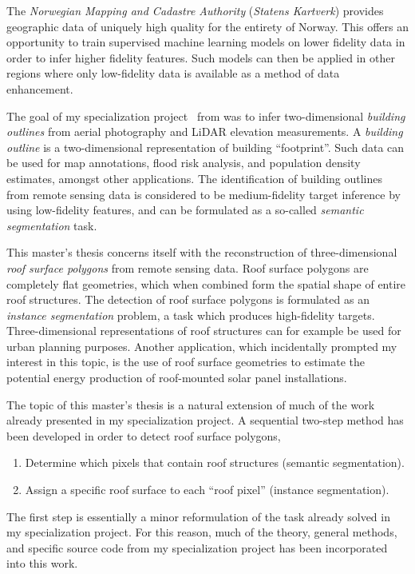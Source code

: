 The \textit{Norwegian Mapping and Cadastre Authority} (\textit{Statens Kartverk}) provides geographic data of uniquely high quality for the entirety of Norway.
This offers an opportunity to train supervised machine learning models on lower fidelity data in order to infer higher fidelity features.
Such models can then be applied in other regions where only low-fidelity data is available as a method of data enhancement.

The goal of my specialization project~\cite{specialization-project} from  was to infer two-\linebreak{}dimensional \textit{building outlines} from aerial photography and LiDAR elevation measurements.
A \textit{building outline} is a two-dimensional representation of building \enquote{footprint}.
Such data can be used for map annotations, flood risk analysis, and population density estimates, amongst other applications.
The identification of building outlines from remote sensing data is considered to be medium-fidelity target inference by using low-fidelity features, and can be formulated as a so-called \textit{semantic segmentation} task.

This master's thesis concerns itself with the reconstruction of three-dimensional \textit{roof surface polygons} from remote sensing data.
Roof surface polygons are completely flat geometries, which when combined form the spatial shape of entire roof structures.
The detection of roof surface polygons is formulated as an \textit{instance segmentation} problem, a task which produces high-fidelity targets.
Three-dimensional representations of roof structures can for example be used for urban planning purposes.
Another application, which incidentally prompted my interest in this topic, is the use of roof surface geometries to estimate the potential energy production of roof-mounted solar panel installations.

The topic of this master's thesis is a natural extension of much of the work already presented in my specialization project.
A sequential two-step method has been developed in order to detect roof surface polygons,
\begin{enumerate}[noitemsep]
  \item Determine which pixels that contain roof structures (semantic segmentation).
  \item Assign a specific roof surface to each \enquote{roof pixel} (instance segmentation).
\end{enumerate}
The first step is essentially a minor reformulation of the task already solved in my specialization project.
For this reason, much of the theory, general methods, and specific source code from my specialization project has been incorporated into this work.

